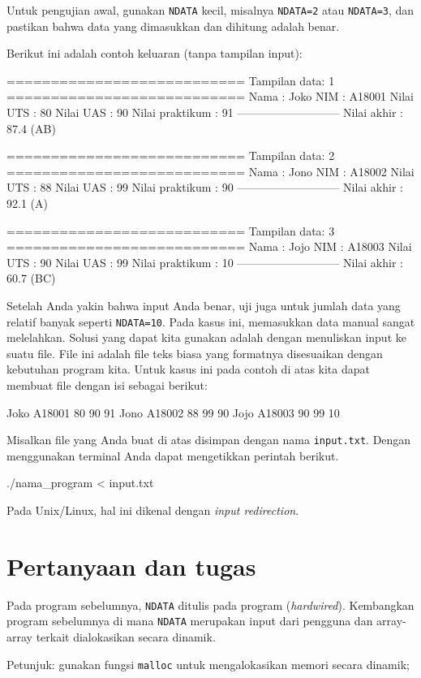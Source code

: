 \documentclass[a4paper,11pt]{extarticle}
\begin{document}
Untuk pengujian awal, gunakan \texttt{NDATA} kecil, misalnya \texttt{NDATA=2} atau
\texttt{NDATA=3}, dan pastikan bahwa data yang dimasukkan dan dihitung adalah benar.

Berikut ini adalah contoh keluaran (tanpa tampilan input):
\begin{textcode}
===========================
Tampilan data: 1
===========================
Nama            : Joko
NIM             : A18001
Nilai UTS       : 80
Nilai UAS       : 90
Nilai praktikum : 91
---------------------------
Nilai akhir     : 87.4 (AB)

===========================
Tampilan data: 2
===========================
Nama            : Jono
NIM             : A18002
Nilai UTS       : 88
Nilai UAS       : 99
Nilai praktikum : 90
---------------------------
Nilai akhir     : 92.1 (A)

===========================
Tampilan data: 3
===========================
Nama            : Jojo
NIM             : A18003
Nilai UTS       : 90
Nilai UAS       : 99
Nilai praktikum : 10
---------------------------
Nilai akhir     : 60.7 (BC)
\end{textcode}

Setelah Anda yakin bahwa input Anda benar, uji juga untuk jumlah data yang relatif
banyak seperti \texttt{NDATA=10}. Pada kasus ini, memasukkan data manual sangat melelahkan.
Solusi yang dapat kita gunakan adalah dengan menuliskan input ke suatu file.
File ini adalah file teks biasa yang formatnya disesuaikan dengan kebutuhan program
kita. Untuk kasus ini pada contoh di atas kita dapat membuat file dengan isi sebagai
berikut:
\begin{textcode}
Joko A18001 80 90 91
Jono A18002 88 99 90
Jojo A18003 90 99 10
\end{textcode}
Misalkan file yang Anda buat di atas disimpan dengan nama \texttt{input.txt}.
Dengan menggunakan terminal Anda dapat mengetikkan perintah berikut.
\begin{textcode}
./nama_program < input.txt
\end{textcode}
Pada Unix/Linux, hal ini dikenal dengan \textit{input redirection}.

\section{Pertanyaan dan tugas}

Pada program sebelumnya, \texttt{NDATA} ditulis pada program
(\textit{hardwired}). Kembangkan program sebelumnya di mana \texttt{NDATA}
merupakan input dari pengguna dan array-array terkait dialokasikan secara
dinamik.

Petunjuk: gunakan fungsi \texttt{malloc} untuk mengalokasikan memori secara dinamik;
\end{document}
